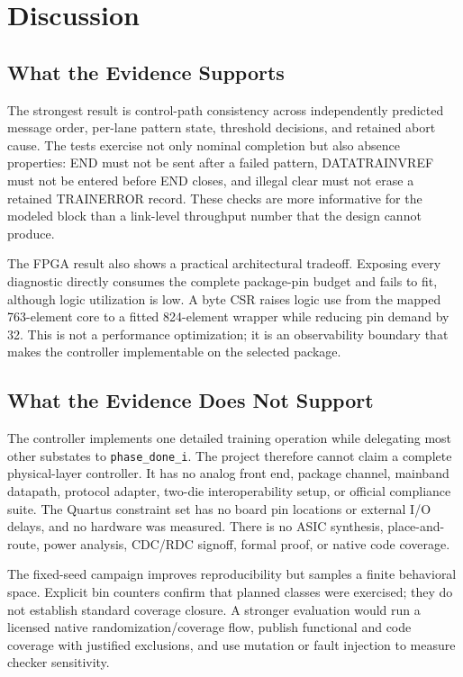\section{Discussion}
\label{sec:discussion}

\subsection{What the Evidence Supports}

The strongest result is control-path consistency across independently predicted
message order, per-lane pattern state, threshold decisions, and retained abort
cause. The tests exercise not only nominal completion but also absence
properties: END must not be sent after a failed pattern, DATATRAINVREF must not
be entered before END closes, and illegal clear must not erase a retained
TRAINERROR record. These checks are more informative for the modeled block than
a link-level throughput number that the design cannot produce.

The FPGA result also shows a practical architectural tradeoff. Exposing every
diagnostic directly consumes the complete package-pin budget and fails to fit,
although logic utilization is low. A byte CSR raises logic use from the mapped
763-element core to a fitted 824-element wrapper while reducing pin demand by
32. This is not a performance optimization; it is an observability boundary
that makes the controller implementable on the selected package.

\subsection{What the Evidence Does Not Support}

The controller implements one detailed training operation while delegating most
other substates to \texttt{phase\_done\_i}. The project therefore cannot claim a
complete physical-layer controller. It has no analog front end, package channel,
mainband datapath, protocol adapter, two-die interoperability setup, or official
compliance suite. The Quartus constraint set has no board pin locations or
external I/O delays, and no hardware was measured. There is no ASIC synthesis,
place-and-route, power analysis, CDC/RDC signoff, formal proof, or native code
coverage.

The fixed-seed campaign improves reproducibility but samples a finite behavioral
space. Explicit bin counters confirm that planned classes were exercised; they
do not establish standard coverage closure. A stronger evaluation would run a
licensed native randomization/coverage flow, publish functional and code
coverage with justified exclusions, and use mutation or fault injection to
measure checker sensitivity.

